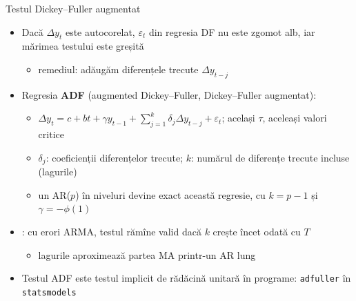 \begin{frame}{Testul Dickey--Fuller augmentat}
\itemsize{\small}
\begin{itemize}
    \item Dacă $\Delta y_t$ este autocorelat, $\varepsilon_t$ din regresia DF nu este zgomot alb, iar mărimea testului este greșită
    \begin{itemize}
        \item remediul: adăugăm diferențele trecute $\Delta y_{t-j}$
    \end{itemize}
    \item Regresia \textbf{ADF} (augmented Dickey--Fuller, Dickey--Fuller augmentat):
    \begin{itemize}
        \item $\Delta y_t = c + bt + \gamma y_{t-1} + \sum_{j=1}^{k} \delta_j \Delta y_{t-j} + \varepsilon_t$; același $\tau$, aceleași valori critice
        \item $\delta_j$: coeficienții diferențelor trecute; $k$: numărul de diferențe trecute incluse (lagurile)
        \item un AR($p$) în niveluri devine exact această regresie, cu $k = p - 1$ și $\gamma = -\phi(1)$
    \end{itemize}
    \item {}: cu erori ARMA, testul rămîne valid dacă $k$ crește încet odată cu $T$
    \begin{itemize}
        \item lagurile aproximează partea MA printr-un AR lung
    \end{itemize}
    \item Testul ADF este testul implicit de rădăcină unitară în programe: \texttt{adfuller} în \texttt{statsmodels}
\end{itemize}
\end{frame}

